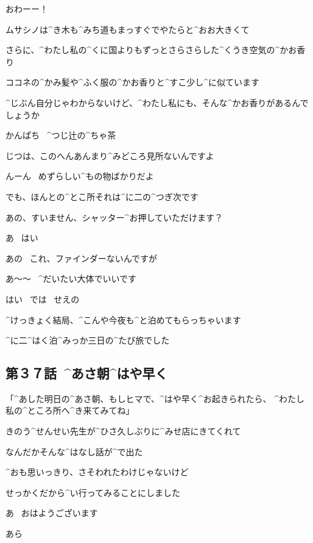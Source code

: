 \Alpha おわーー！

\page[60]
\Alpha ムサシノは^{き}{木}も^{みち}{道}もまっすぐでやたらと^{おお}{大}きくて

\page[61]
\Alpha さらに、^{わたし}{私}の^{くに}{国}よりもずっとさらさらした^{くうき}{空気}の^{かお}{香}り

\Alpha ココネの^{かみ}{髪}や^{ふく}{服}の^{かお}{香}りと^{すこ}{少}し^{に}{似}ています

\Alpha ^{じぶん}{自分}じゃわからないけど、^{わたし}{私}にも、そんな^{かお}{香}りがあるんでしょうか

\page[62]
\Sign かんぱち
\ ^{つじ}{辻}の^{ちゃ}{茶}

\Kokone じつは、このへんあんまり^{みどころ}{見所}ないんですよ

\Alpha んーん
\ めずらしい^{もの}{物}ばかりだよ

\Alpha でも、ほんとの^{とこ}{所}それは^{に}{二}の^{つぎ}{次}です

\page[63]
\Alpha あの、すいません、シャッター^{お}{押}していただけます？

\Person あ
\ はい

\Person あの
\ これ、ファインダーないんですが

\Alpha あ〜〜
\ ^{だいたい}{大体}でいいです

\Person はい
\ では
\ せえの

\page[64]
\Alpha ^{けっきょく}{結局}、^{こんや}{今夜}も^{と}{泊}めてもらっちゃいます

\Alpha ^{に}{二}^{はく}{泊}^{みっか}{三日}の^{たび}{旅}でした


\subsection{第３７話\ ^{あさ}{朝}^{はや}{早}く}

\page[68]
\Sensei 「^{あした}{明日}の^{あさ}{朝}、もしヒマで、^{はや}{早}く^{お}{起}きられたら、
  ^{わたし}{私}の^{ところ}{所}へ^{き}{来}てみてね」

\Alpha きのう^{せんせい}{先生}が^{ひさ}{久}しぶりに^{みせ}{店}にきてくれて

\Alpha なんだかそんな^{はなし}{話}が^{で}{出}た

\page[69]
\Alpha ^{おも}{思}いっきり、さそわれたわけじゃないけど

\Alpha せっかくだから^{い}{行}ってみることにしました

\page[70]
\Alpha あ
\ おはようございます

\Sensei あら

